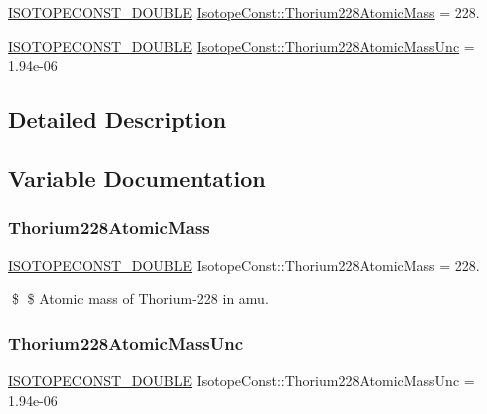 \begin{DoxyCompactItemize}
\item 
\mbox{\hyperlink{group___isotope_const-_macros_ga8f45a7272ce02c0b4c65c44636ed719a}{I\+S\+O\+T\+O\+P\+E\+C\+O\+N\+S\+T\+\_\+\+D\+O\+U\+B\+LE}} \mbox{\hyperlink{group___isotope_const-_thorium-_th228_ga980459ca6d5641ff91283ecb93ecd65c}{Isotope\+Const\+::\+Thorium228\+Atomic\+Mass}} = 228.
\item 
\mbox{\hyperlink{group___isotope_const-_macros_ga8f45a7272ce02c0b4c65c44636ed719a}{I\+S\+O\+T\+O\+P\+E\+C\+O\+N\+S\+T\+\_\+\+D\+O\+U\+B\+LE}} \mbox{\hyperlink{group___isotope_const-_thorium-_th228_ga7be6dfce603c50f20eebfb26e23184c6}{Isotope\+Const\+::\+Thorium228\+Atomic\+Mass\+Unc}} = 1.\+94e-\/06
\end{DoxyCompactItemize}


\subsection{Detailed Description}


\subsection{Variable Documentation}
\mbox{\label{group___isotope_const-_thorium-_th228_ga980459ca6d5641ff91283ecb93ecd65c}} 
\subsubsection{\texorpdfstring{Thorium228\+Atomic\+Mass}{Thorium228AtomicMass}}
{\footnotesize\ttfamily \mbox{\hyperlink{group___isotope_const-_macros_ga8f45a7272ce02c0b4c65c44636ed719a}{I\+S\+O\+T\+O\+P\+E\+C\+O\+N\+S\+T\+\_\+\+D\+O\+U\+B\+LE}} Isotope\+Const\+::\+Thorium228\+Atomic\+Mass = 228.}

\$ \$ Atomic mass of Thorium-\/228 in amu. \mbox{\label{group___isotope_const-_thorium-_th228_ga7be6dfce603c50f20eebfb26e23184c6}} 
\subsubsection{\texorpdfstring{Thorium228\+Atomic\+Mass\+Unc}{Thorium228AtomicMassUnc}}
{\footnotesize\ttfamily \mbox{\hyperlink{group___isotope_const-_macros_ga8f45a7272ce02c0b4c65c44636ed719a}{I\+S\+O\+T\+O\+P\+E\+C\+O\+N\+S\+T\+\_\+\+D\+O\+U\+B\+LE}} Isotope\+Const\+::\+Thorium228\+Atomic\+Mass\+Unc = 1.\+94e-\/06}

